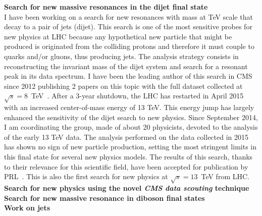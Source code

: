 \documentclass[10pt, a4paper]{article}
\begin{document}
{\bf Search for new massive resonances in the dijet final state}\\
I have been working on a search for new resonances with mass at TeV
scale that decay to a pair of jets (dijet). This search is one of the most 
sensitive probes for new physics at LHC because any hypothetical new
particle that might be produced is originated from the
colliding protons and therefore it must couple to quarks and/or
gluons, thus producing jets. The analysis strategy consists in
reconstructing the invariant mass of the dijet system and search for a
resonant peak in its data spectrum. I have been the leading author of this
search in CMS since 2012 publishing 2 papers on this topic with the
full dataset collected at $\sqrt{s}=8$~TeV~\cite{Chatrchyan:2013qha,Khachatryan:2015sja}. After a 3-year
shutdown, the LHC has restarted in April 2015 with an increased 
center-of-mass energy of 13 TeV. This energy jump has largely enhanced the
sensitivity of the dijet search to new physics. Since September 2014, I
am coordinating the group, made of about 20 physicists, devoted to the
analysis of the early 13 TeV data. The analysis performed on the data
collected in 2015 has shown no sign of new particle
production, setting the most stringent limits in this final state for several new physics
models. The results of this search, thanks to their
relevance for this scientific 
field, have been accepted for publication by PRL~\cite{Khachatryan:2015dcf}. 
This is also the first search for new physics at $\sqrt{s}=13$~TeV from LHC.
\\[1em]

{\bf Search for new physics using the novel {\it CMS data scouting} technique}\\

{\bf Search for new massive resonance in diboson final states} \\[1em]

{\bf Work on jets}


\end{document}
